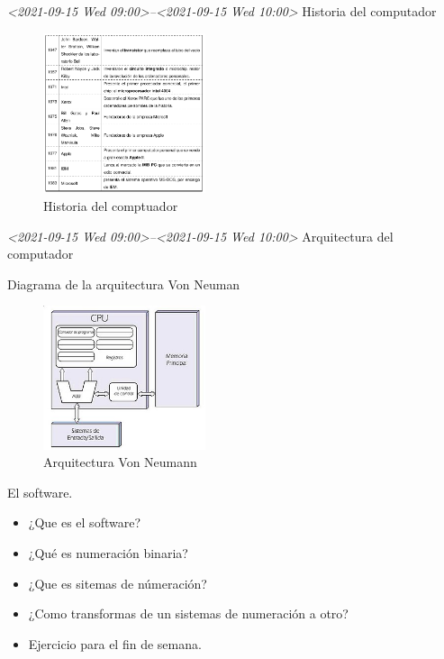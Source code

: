 \documentclass[presentation, aspectratio=54]{beamer}
\begin{document}
\begin{frame}[label={sec:org211954d}]{\textit{<2021-09-15 Wed 09:00>--<2021-09-15 Wed 10:00> } Historia del computador}
\begin{figure}[htbp]
\centering
\includegraphics[width=180px]{./images/historia2.png}
\caption{Historia del comptuador}
\end{figure}
\end{frame}


\begin{frame}[label={sec:org58c1052}]{\textit{<2021-09-15 Wed 09:00>--<2021-09-15 Wed 10:00> } Arquitectura del computador}
\begin{block}{Diagrama de la arquitectura Von Neuman}
\begin{figure}[htbp]
\centering
\includegraphics[width=180px]{./images/Arquitecturaneumann.jpg}
\caption{Arquitectura Von Neumann}
\end{figure}
\end{block}
\end{frame}


\begin{frame}[label={sec:orgadf21e8}]{El software.}
\begin{itemize}
\item ¿Que es el software?
\item ¿Qué es numeración binaria?
\item ¿Que es sitemas de númeración?
\item ¿Como transformas de un sistemas de numeración a otro?
\item Ejercicio para el fin de semana.
\end{itemize}
\end{frame}
\end{document}
